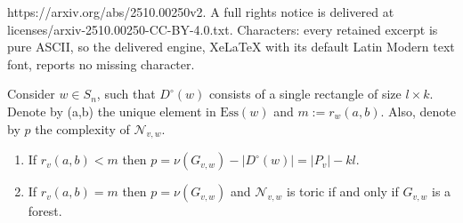 \documentclass[10pt,a4paper]{amsart}
\newcommand{\Dc}{D^{\circ}}
\newcommand{\Ess}{\mathrm{Ess}}
\newcommand{\Gvwt}{G_{v,w}}
\newcommand{\Nvw}{\mathcal{N}_{v,w}}
\newcommand{\cn}{\nu}
\newcommand{\rk}{r}
\begin{document}
https://arxiv.org/abs/2510.00250v2. A full rights notice is delivered at licenses/arxiv-2510.00250-CC-BY-4.0.txt. Characters: every retained excerpt is pure ASCII, so the delivered engine, XeLaTeX with its default Latin Modern text font, reports no missing character.
\begin{proposition}\label{prop: rectangle comp}
    Consider $w\in S_n$, such that $\Dc(w)$ consists of a single rectangle of size $l \times k$. Denote by (a,b) the unique element in $\Ess(w)$ and $m := r_w(a,b)$. Also, denote by $p$ the complexity of $\Nvw$.
    \begin{enumerate}
        \item If $\rk_v(a,b) < m$ then $p= \cn(\Gvwt) - |\Dc(w)| =  |P_v|- kl$. 
        \item If $\rk_v(a,b) =m$ then $p = \cn(\Gvwt)$ and $\Nvw$ is toric if and only if $\Gvwt$ is a forest.
    \end{enumerate}
    \end{proposition}
\end{document}
